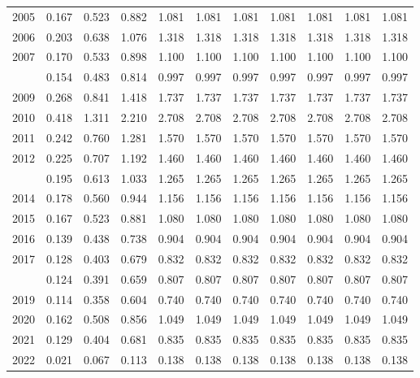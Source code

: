 \documentclass[
]{article}
\begin{document}
\begin{longtable}[t]{lrrrrrrrrrr}
2005 & 0.167 & 0.523 & 0.882 & 1.081 & 1.081 & 1.081 & 1.081 & 1.081 & 1.081 & 1.081\\
2006 & 0.203 & 0.638 & 1.076 & 1.318 & 1.318 & 1.318 & 1.318 & 1.318 & 1.318 & 1.318\\
2007 & 0.170 & 0.533 & 0.898 & 1.100 & 1.100 & 1.100 & 1.100 & 1.100 & 1.100 & 1.100\\
\addlinespace
2008 & 0.154 & 0.483 & 0.814 & 0.997 & 0.997 & 0.997 & 0.997 & 0.997 & 0.997 & 0.997\\
2009 & 0.268 & 0.841 & 1.418 & 1.737 & 1.737 & 1.737 & 1.737 & 1.737 & 1.737 & 1.737\\
2010 & 0.418 & 1.311 & 2.210 & 2.708 & 2.708 & 2.708 & 2.708 & 2.708 & 2.708 & 2.708\\
2011 & 0.242 & 0.760 & 1.281 & 1.570 & 1.570 & 1.570 & 1.570 & 1.570 & 1.570 & 1.570\\
2012 & 0.225 & 0.707 & 1.192 & 1.460 & 1.460 & 1.460 & 1.460 & 1.460 & 1.460 & 1.460\\
\addlinespace
2013 & 0.195 & 0.613 & 1.033 & 1.265 & 1.265 & 1.265 & 1.265 & 1.265 & 1.265 & 1.265\\
2014 & 0.178 & 0.560 & 0.944 & 1.156 & 1.156 & 1.156 & 1.156 & 1.156 & 1.156 & 1.156\\
2015 & 0.167 & 0.523 & 0.881 & 1.080 & 1.080 & 1.080 & 1.080 & 1.080 & 1.080 & 1.080\\
2016 & 0.139 & 0.438 & 0.738 & 0.904 & 0.904 & 0.904 & 0.904 & 0.904 & 0.904 & 0.904\\
2017 & 0.128 & 0.403 & 0.679 & 0.832 & 0.832 & 0.832 & 0.832 & 0.832 & 0.832 & 0.832\\
\addlinespace
2018 & 0.124 & 0.391 & 0.659 & 0.807 & 0.807 & 0.807 & 0.807 & 0.807 & 0.807 & 0.807\\
2019 & 0.114 & 0.358 & 0.604 & 0.740 & 0.740 & 0.740 & 0.740 & 0.740 & 0.740 & 0.740\\
2020 & 0.162 & 0.508 & 0.856 & 1.049 & 1.049 & 1.049 & 1.049 & 1.049 & 1.049 & 1.049\\
2021 & 0.129 & 0.404 & 0.681 & 0.835 & 0.835 & 0.835 & 0.835 & 0.835 & 0.835 & 0.835\\
2022 & 0.021 & 0.067 & 0.113 & 0.138 & 0.138 & 0.138 & 0.138 & 0.138 & 0.138 & 0.138\\*
\end{longtable}
\end{document}
